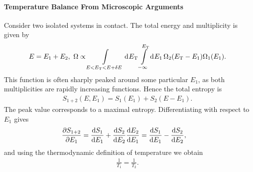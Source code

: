 \paragraph{Temperature Balance From Microscopic Arguments}
Consider two isolated systems in contact. The total energy and multiplicity is given by
\begin{align*}
	E = E_{1} + E_{2},\ \Omega \propto \int\limits_{E < E_{\text{T}} < E + \delta E}^{}\dd[]{E_{\text{T}}}\int\limits_{-\infty}^{E_{\text{T}}}\dd[]{E_{1}}\Omega_{2}(E_{\text{T}} - E_{1})\Omega_{1}(E_{1}).
\end{align*}
This function is often sharply peaked around some particular $E_{1}$, as both multiplicities are rapidly increasing functions. Hence the total entropy is
\begin{align*}
	S_{1 + 2}(E, E_{1}) = S_{1}(E_{1}) + S_{2}(E - E_{1}).
\end{align*}
The peak value corresponds to a maximal entropy. Differentiating with respect to $E_{1}$ gives
\begin{align*}
	\pdv{S_{1 + 2}}{E_{1}}                 &= \dv{S_{1}}{E_{1}} + \dv{S_{2}}{E_{2}}\dv{E_{2}}{E_{1}} = \dv{S_{1}}{E_{1}} - \dv{S_{2}}{E_{2}},
\end{align*}
and using the thermodynamic definition of temperature we obtain
\begin{align*}
	\frac{1}{T_{1}} = \frac{1}{T_{2}}.
\end{align*}

